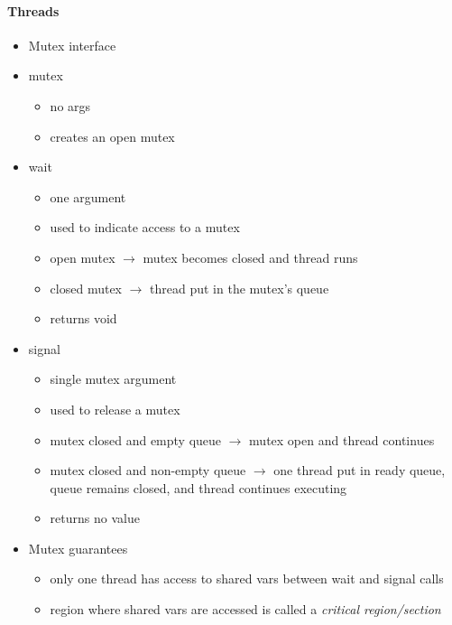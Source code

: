 \documentclass{beamer}
\newcommand{\arrow}{\(\rightarrow\)}
\begin{document}
\begin{frame}[fragile]
\framesubtitle{Threads}
\begin{scriptsize}
\begin{itemize}
\item<1-> Mutex interface

\item<1-> mutex
\begin{itemize}
\scriptsize
  \item no args
  \item creates an open mutex
\end{itemize}

\item<2-> wait
\begin{itemize}
\scriptsize
  \item one argument
  \item used to indicate access to a mutex
  \item open mutex \arrow{} mutex becomes closed and thread runs
  \item closed mutex \arrow{} thread put in the mutex’s queue
  \item returns void
\end{itemize}

\item<3-> signal
\begin{itemize}
\scriptsize
  \item single mutex argument
  \item used to release a mutex
  \item mutex closed and empty queue \arrow{} mutex open and thread continues
  \item mutex closed and non-empty queue \arrow{} one thread put in ready queue, queue remains closed, and thread continues executing
  \item returns no value
\end{itemize}

\item<4-> Mutex  guarantees
\begin{itemize}
\scriptsize
  \item only one thread has access to shared vars between wait and signal calls
  \item region where shared vars are accessed is called a \emph{critical region/section}
\end{itemize}

\end{itemize}
\end{scriptsize}
\end{frame}
\end{document}
